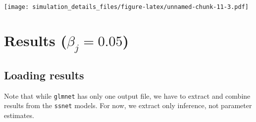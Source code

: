 \documentclass[
]{article}
\begin{document}
\texttt{[image: simulation\_details\_files/figure-latex/unnamed-chunk-11-3.pdf]}

\hypertarget{results-beta_j-0.05}{%
\section{\texorpdfstring{Results
(\(\beta_j = 0.05\))}{Results (\textbackslash beta\_j = 0.05)}}\label{results-beta_j-0.05}}

\hypertarget{loading-results-1}{%
\subsection{Loading results}\label{loading-results-1}}

Note that while \texttt{glmnet} has only one output file, we have to
extract and combine results from the \texttt{ssnet} models. For now, we
extract only inference, not parameter estimates.
\end{document}
